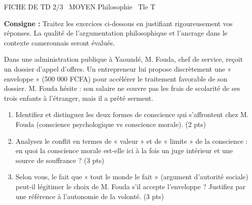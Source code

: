 \documentclass[11pt]{article}
\begin{document}
\begin{tcolorbox}[enhanced,colback=popink,colframe=popink,arc=10pt,boxrule=0pt,left=12pt,right=12pt,top=9pt,bottom=9pt]
{\color{white}\popxbold\small FICHE DE TD 2/3 \textbullet\ MOYEN \hfill Philosophie \textbullet\ Tle T\par}
\end{tcolorbox}
\vspace{4pt}
\noindent \textbf{Consigne :} Traitez les exercices ci-dessous en justifiant rigoureusement vos réponses. La qualité de l'argumentation philosophique et l'ancrage dans le contexte camerounais seront évalués.

\begin{exercice}
Dans une administration publique à Yaoundé, M. Fouda, chef de service, reçoit un dossier d'appel d'offres. Un entrepreneur lui propose discrètement une « enveloppe » (500 000 FCFA) pour accélérer le traitement favorable de son dossier. M. Fouda hésite : son salaire ne couvre pas les frais de scolarité de ses trois enfants à l'étranger, mais il a prêté serment.
\begin{enumerate}
    \item Identifiez et distinguez les deux formes de conscience qui s'affrontent chez M. Fouda (conscience psychologique vs conscience morale). (2 pts)
    \item Analysez le conflit en termes de « valeur » et de « limite » de la conscience : en quoi la conscience morale est-elle ici à la fois un juge intérieur et une source de souffrance ? (3 pts)
    \item Selon vous, le fait que « tout le monde le fait » (argument d'autorité sociale) peut-il légitimer le choix de M. Fouda s'il accepte l'enveloppe ? Justifiez par une référence à l'autonomie de la volonté. (3 pts)
\end{enumerate}
\end{exercice}
\end{document}
